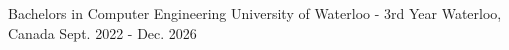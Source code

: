 

\begin{cventries}

	\cventry
	{Bachelors in Computer Engineering} %
	{University of Waterloo - 3rd Year} %
	{Waterloo, Canada} %
	{Sept. 2022 - Dec. 2026} %
	{
	}

\end{cventries}
